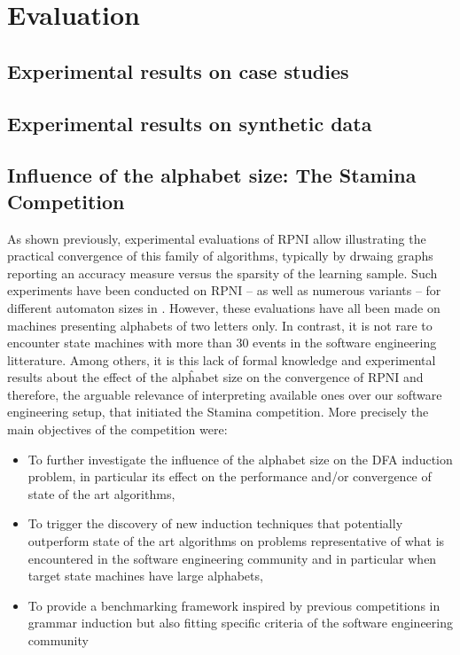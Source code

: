 \chapter{Evaluation}

\section{Experimental results on case studies}

\section{Experimental results on synthetic data}

\section{Influence of the alphabet size: The Stamina Competition\label{section_stamina}}

As shown previously, experimental evaluations of RPNI allow illustrating the practical convergence of this family of algorithms, typically by drwaing graphs reporting an accuracy measure versus the sparsity of the learning sample. Such experiments have been conducted on RPNI -- as well as numerous variants -- for different automaton sizes in \cite{Lang98,Damas06,Dupont08,Lambeau08}. However, these evaluations have all been made on machines presenting alphabets of two letters only. In contrast, it is not rare to encounter state machines with more than 30 events in the software engineering litterature. Among others, it is this lack of formal knowledge and experimental results about the effect of the alpĥabet size on the convergence of RPNI and therefore, the arguable relevance of interpreting available ones over our software engineering setup, that initiated the Stamina competition. More precisely the main objectives of the competition were:

\begin{itemize}
\item To further investigate the influence of the alphabet size on the DFA induction problem, in particular its effect on the performance and/or convergence of state of the art algorithms,
\item To trigger the discovery of new induction techniques that potentially outperform state of the art algorithms on problems representative of what is encountered in the software engineering community and in particular when target state machines have large alphabets,
\item To provide a benchmarking framework inspired by previous competitions in grammar induction but also fitting specific criteria of the software engineering community
\end{itemize}

